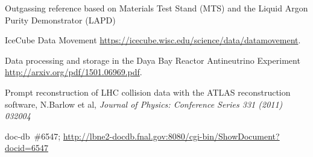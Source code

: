 \begin{thebibliography}{99}


 Outgassing reference based on Materials Test Stand (MTS) and the Liquid Argon Purity Demonstrator (LAPD)

%
%

%
%

%
%

 IceCube Data Movement \url{https://icecube.wisc.edu/science/data/datamovement}.

Data processing and storage in the Daya Bay Reactor Antineutrino Experiment \url{http://arxiv.org/pdf/1501.06969.pdf}.

 Prompt reconstruction of LHC collision data with the ATLAS reconstruction software, N.Barlow et al, \textit{Journal of Physics: Conference Series 331 (2011) 032004}

%
%
 
%
%
 doc-db~\#6547; \url{http://lbne2-docdb.fnal.gov:8080/cgi-bin/ShowDocument?docid=6547}

%
%


\end{thebibliography}
